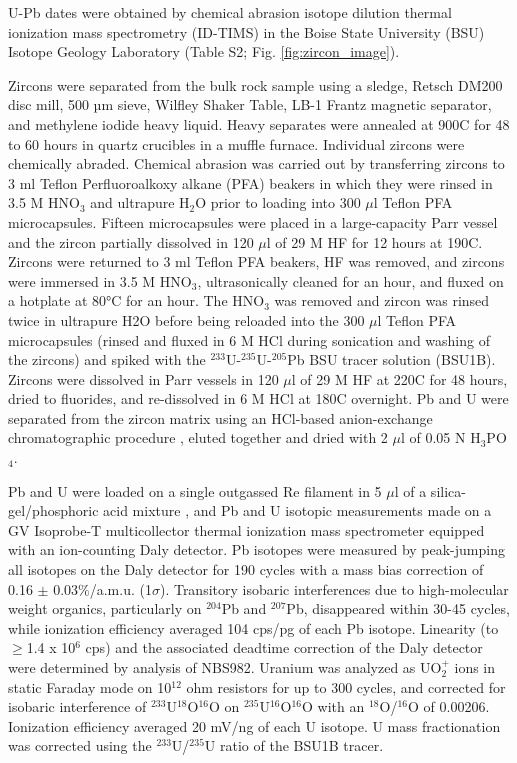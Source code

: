 U-Pb dates were obtained by chemical abrasion isotope dilution thermal ionization mass spectrometry (ID-TIMS) in the Boise State University (BSU) Isotope Geology Laboratory (Table S2; Fig. \ref{fig:zircon_image}). 

Zircons were separated from the bulk rock sample using a sledge, Retsch DM200 disc mill, 500 µm sieve, Wilfley Shaker Table, LB-1 Frantz magnetic separator, and methylene iodide heavy liquid. Heavy separates were annealed at 900\textdegree C for 48 to 60 hours in quartz crucibles in a muffle furnace. Individual zircons were chemically abraded. Chemical abrasion was carried out by transferring zircons to 3 ml Teflon Perfluoroalkoxy alkane (PFA) beakers in which they were rinsed in 3.5 M HNO$_\mathrm{3}$ and ultrapure H$_\mathrm{2}$O prior to loading into 300 $\mu$l Teflon PFA microcapsules. Fifteen microcapsules were placed in a large-capacity Parr vessel and the zircon partially dissolved in 120 $\mu$l of 29 M HF for 12 hours at 190\textdegree C. Zircons were returned to 3 ml Teflon PFA beakers, HF was removed, and zircons were immersed in 3.5 M HNO$_\mathrm{3}$, ultrasonically cleaned for an hour, and fluxed on a hotplate at 80°C for an hour. The HNO$_\mathrm{3}$ was removed and zircon was rinsed twice in ultrapure H2O before being reloaded into the 300 $\mu$l Teflon PFA microcapsules (rinsed and fluxed in 6 M HCl during sonication and washing of the zircons) and spiked with the $^{233}$U-$^{235}$U-$^{205}$Pb BSU tracer solution (BSU1B). Zircons were dissolved in Parr vessels in 120 $\mu$l of 29 M HF at 220\textdegree C for 48 hours, dried to fluorides, and re-dissolved in 6 M HCl at 180\textdegree C overnight. Pb and U were separated from the zircon matrix using an HCl-based anion-exchange chromatographic procedure \citep{Krogh1973a}, eluted together and dried with 2 $\mu$l of 0.05 N H$_\mathrm{3}$PO$_\mathrm{4}$.

Pb and U were loaded on a single outgassed Re filament in 5 $\mu$l of a silica-gel/phosphoric acid mixture \citep{Gerstenberger1997a}, and Pb and U isotopic measurements made on a GV Isoprobe-T multicollector thermal ionization mass spectrometer equipped with an ion-counting Daly detector. Pb isotopes were measured by peak-jumping all isotopes on the Daly detector for 190 cycles with a mass bias correction of 0.16 $\pm$ 0.03$\%$/a.m.u. (1$\sigma$). Transitory isobaric interferences due to high-molecular weight organics, particularly on $^{204}$Pb and $^{207}$Pb, disappeared within 30-45 cycles, while ionization efficiency averaged 104 cps/pg of each Pb isotope. Linearity (to $\geq$1.4 x 10$^6$ cps) and the associated deadtime correction of the Daly detector were determined by analysis of NBS982. Uranium was analyzed as UO$_2^+$ ions in static Faraday mode on 10$^{12}$ ohm resistors for up to 300 cycles, and corrected for isobaric interference of $^{233}$U$^{18}$O$^{16}$O on $^{235}$U$^{16}$O$^{16}$O with an $^{18}$O/$^{16}$O of 0.00206. Ionization efficiency averaged 20 mV/ng of each U isotope. U mass fractionation was corrected using the $^{233}$U/$^{235}$U ratio of the BSU1B tracer. 


